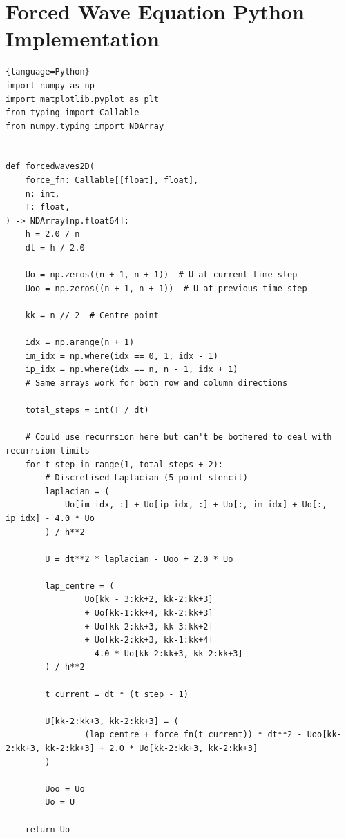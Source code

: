 \section{Forced Wave Equation Python Implementation}

\begin{lstlisting}{language=Python}
import numpy as np
import matplotlib.pyplot as plt
from typing import Callable
from numpy.typing import NDArray


def forcedwaves2D(
    force_fn: Callable[[float], float],
    n: int,
    T: float,
) -> NDArray[np.float64]:
    h = 2.0 / n
    dt = h / 2.0

    Uo = np.zeros((n + 1, n + 1))  # U at current time step
    Uoo = np.zeros((n + 1, n + 1))  # U at previous time step

    kk = n // 2  # Centre point

    idx = np.arange(n + 1)
    im_idx = np.where(idx == 0, 1, idx - 1)
    ip_idx = np.where(idx == n, n - 1, idx + 1)
    # Same arrays work for both row and column directions

    total_steps = int(T / dt)

    # Could use recurrsion here but can't be bothered to deal with recurrsion limits
    for t_step in range(1, total_steps + 2):
        # Discretised Laplacian (5-point stencil)
        laplacian = (
            Uo[im_idx, :] + Uo[ip_idx, :] + Uo[:, im_idx] + Uo[:, ip_idx] - 4.0 * Uo
        ) / h**2

        U = dt**2 * laplacian - Uoo + 2.0 * Uo

        lap_centre = (
                Uo[kk - 3:kk+2, kk-2:kk+3]
                + Uo[kk-1:kk+4, kk-2:kk+3]
                + Uo[kk-2:kk+3, kk-3:kk+2]
                + Uo[kk-2:kk+3, kk-1:kk+4]
                - 4.0 * Uo[kk-2:kk+3, kk-2:kk+3]
        ) / h**2

        t_current = dt * (t_step - 1)

        U[kk-2:kk+3, kk-2:kk+3] = (
                (lap_centre + force_fn(t_current)) * dt**2 - Uoo[kk-2:kk+3, kk-2:kk+3] + 2.0 * Uo[kk-2:kk+3, kk-2:kk+3]
        )

        Uoo = Uo
        Uo = U

    return Uo
\end{lstlisting}